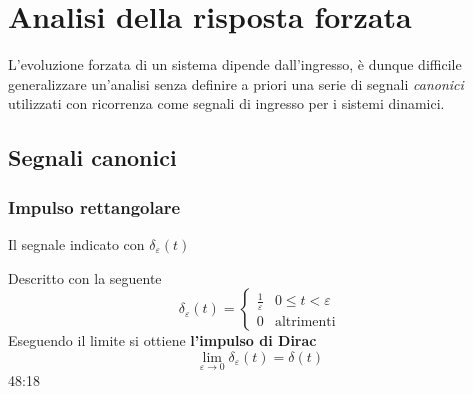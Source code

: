 \newpage
\section{Analisi della risposta forzata}
L'evoluzione forzata di un sistema dipende dall'ingresso, è dunque difficile
generalizzare un'analisi senza definire a priori una serie di segnali
\textit{canonici} utilizzati con ricorrenza come segnali di ingresso per i
sistemi dinamici.

\subsection{Segnali canonici}
\subsubsection{Impulso rettangolare}
Il segnale indicato con $\delta_\varepsilon(t)$
\begin{figure}[h]
\centering
\end{figure}

Descritto con la seguente
$$
\delta_\varepsilon(t) =
\begin{cases}
\frac{1}{\varepsilon} & 0\leq t <\varepsilon \\
0 & \text{altrimenti}
\end{cases}
$$
Eseguendo il limite si ottiene \textbf{l'impulso di Dirac}
$$
\lim_{\varepsilon \to 0} \delta_\varepsilon(t) = \delta(t)
$$
48:18
